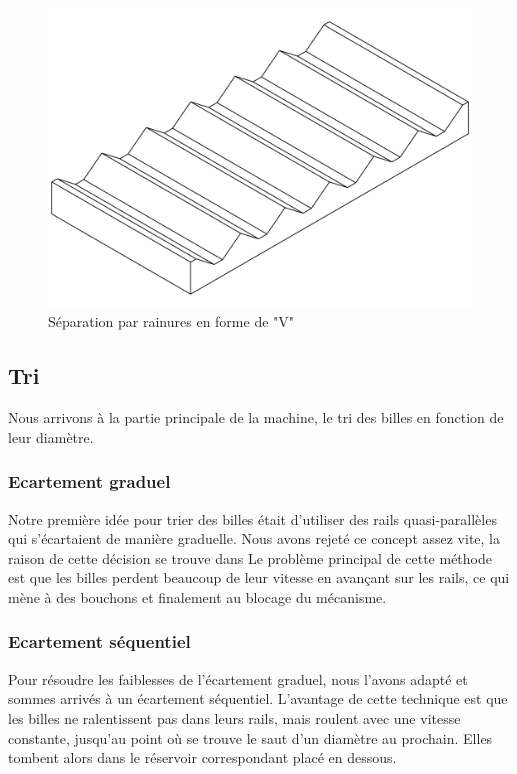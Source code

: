 \begin{figure}
    \centering
    \includegraphics[width=\textwidth]{Graphics/Rails/SEPARATEUR_V.pdf}
    \caption{Séparation par rainures en forme de "V"}
\end{figure}

\subsection{Tri}
Nous arrivons à la partie principale de la machine, le tri des billes en fonction de leur diamètre.

\subsubsection{Ecartement graduel}
Notre première idée pour trier des billes était d'utiliser des rails quasi-parallèles qui s'écartaient de manière graduelle. Nous avons rejeté ce concept assez vite, la raison de cette décision se trouve dans %
Le problème principal de cette méthode est que les billes perdent beaucoup de leur vitesse en avançant sur les rails, ce qui mène à des bouchons et finalement au blocage du mécanisme.

\subsubsection{Ecartement séquentiel}
Pour résoudre les faiblesses de l'écartement graduel, nous l'avons adapté et sommes arrivés à un écartement séquentiel. L'avantage de cette technique est que les billes ne ralentissent pas dans leurs rails, mais roulent avec une vitesse constante, jusqu'au point où se trouve le saut d'un diamètre au prochain. Elles tombent alors dans le réservoir correspondant placé en dessous.

